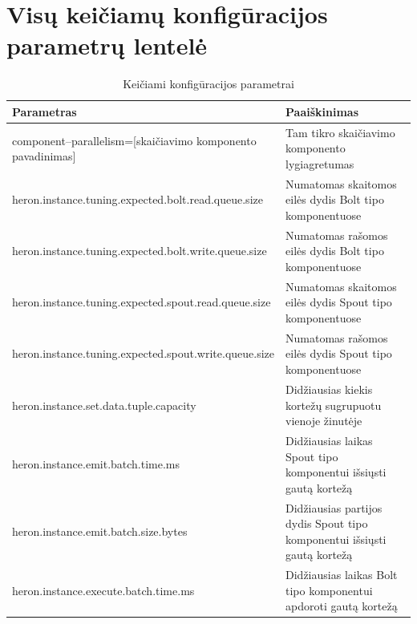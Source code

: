 \documentclass{VUMIFPSbakalaurinis}
\begin{document}
\printbibliography[heading=bibintoc] 

\appendix
\section{Visų keičiamų konfigūracijos parametrų lentelė}
\begin{longtable}{|p{0.59\linewidth}|p{0.41\linewidth}|}
    \caption{Keičiami konfigūracijos parametrai}
    \label{param–table}\\
    \hline
    \rowcolor[HTML]{C0C0C0} 
    Parametras                                              & Paaiškinimas                                                                                 \\ \hline
    \endfirsthead
    \endhead
    component–parallelism=[skaičiavimo komponento pavadinimas]            & Tam tikro skaičiavimo komponento lygiagretumas                                 \\ \hline
    heron.instance.tuning.expected.bolt.read.queue.size                   & Numatomas skaitomos eilės dydis Bolt tipo komponentuose                        \\ \hline
    heron.instance.tuning.expected.bolt.write.queue.size                  & Numatomas rašomos eilės dydis Bolt tipo komponentuose                          \\ \hline
    heron.instance.tuning.expected.spout.read.queue.size                  & Numatomas skaitomos eilės dydis Spout tipo komponentuose                       \\ \hline
    heron.instance.tuning.expected.spout.write.queue.size                 & Numatomas rašomos eilės dydis Spout tipo komponentuose                         \\ \hline
    heron.instance.set.data.tuple.capacity                                & Didžiausias kiekis kortežų sugrupuotu vienoje žinutėje                        \\ \hline
    heron.instance.emit.batch.time.ms                                     & Didžiausias laikas Spout tipo komponentui išsiųsti gautą kortežą               \\ \hline
    heron.instance.emit.batch.size.bytes                                  & Didžiausias partijos dydis Spout tipo komponentui išsiųsti gautą kortežą       \\ \hline
    heron.instance.execute.batch.time.ms                                  & Didžiausias laikas Bolt tipo komponentui apdoroti gautą kortežą                \\ \hline

\end{longtable}
\end{document}
